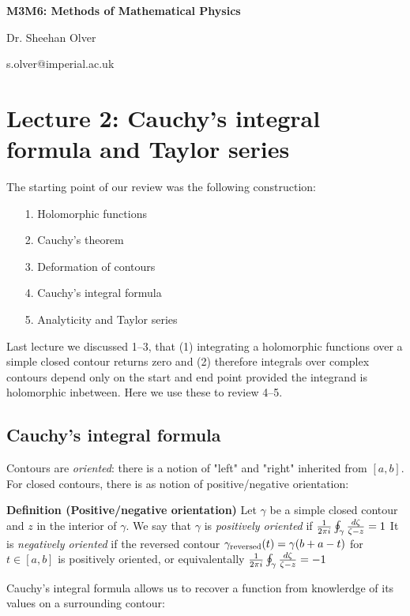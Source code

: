 \documentclass[12pt,a4paper]{article}
\def\endash{–}
\begin{document}
\textbf{M3M6: Methods of Mathematical Physics}

Dr. Sheehan Olver

s.olver@imperial.ac.uk

\section{Lecture 2: Cauchy's integral formula and Taylor series}
The starting point of our review was the following construction:

\begin{itemize}
\item[1. ] Holomorphic functions


\item[2. ] Cauchy's theorem 


\item[3. ] Deformation of contours


\item[4. ] Cauchy's integral formula


\item[5. ] Analyticity and Taylor series

\end{itemize}
Last lecture we discussed 1\ensuremath{\endash}3, that (1) integrating a holomorphic functions over a simple closed contour returns zero and (2) therefore integrals over complex contours depend only on the start and end point provided the integrand is holomorphic inbetween. Here we use these to review 4\ensuremath{\endash}5.

\subsection{Cauchy's integral formula}
Contours are \emph{oriented}: there is a notion of "left" and "right" inherited from $[a,b]$. For closed contours, there is as notion of positive/negative orientation:

\textbf{Definition (Positive/negative orientation)} Let $\gamma$ be a simple closed contour and $z$ in the interior of $\gamma$.  We say that $\gamma$ is \emph{positively oriented} if  ${1 \over 2 \pi i} \oint_\gamma {d\zeta \over \zeta - z} = 1$ It is \emph{negatively oriented} if the reversed contour $\gamma_{\rm reversed}(t) = \gamma(b+a-t)$ for $t \in [a,b]$ is positively oriented, or equivalentally ${1 \over 2 \pi i} \oint_\gamma {d\zeta \over \zeta - z} = -1$

Cauchy's integral formula allows us to recover a function from knowlerdge of its values on a surrounding contour:
\end{document}
